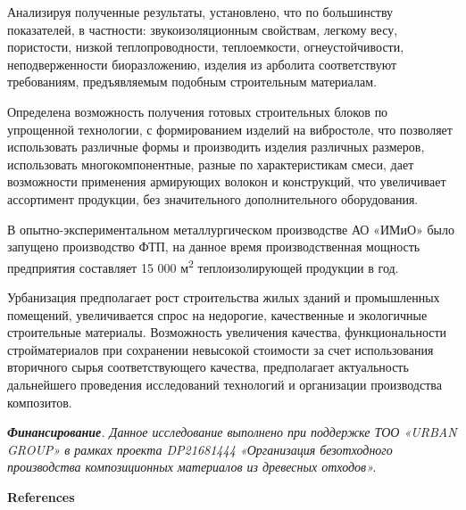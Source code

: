 \begin{multicols}{2}
Анализируя полученные результаты, установлено, что по большинству
показателей, в частности: звукоизоляционным свойствам, легкому весу,
пористости, низкой теплопроводности, теплоемкости, огнеустойчивости,
неподверженности биоразложению, изделия из арболита соответствуют
требованиям, предъявляемым подобным строительным материалам.

Определена возможность получения готовых строительных блоков по
упрощенной технологии, с формированием изделий на вибростоле, что
позволяет использовать различные формы и производить изделия различных
размеров, использовать многокомпонентные, разные по характеристикам
смеси, дает возможности применения армирующих волокон и конструкций, что
увеличивает ассортимент продукции, без значительного дополнительного
оборудования.

В опытно-экспериментальном металлургическом производстве АО «ИМиО» было
запущено производство ФТП, на данное время производственная мощность
предприятия составляет 15 000 м\textsuperscript{2} теплоизолирующей
продукции в год.

Урбанизация предполагает рост строительства жилых зданий и промышленных
помещений, увеличивается спрос на недорогие, качественные и экологичные
строительные материалы. Возможность увеличения качества,
функциональности стройматериалов при сохранении невысокой стоимости за
счет использования вторичного сырья соответствующего качества,
предполагает актуальность дальнейшего проведения исследований технологий
и организации производства композитов.

\emph{{\bfseries Финансирование}. Данное исследование выполнено при
поддержке ТОО «URBAN GROUP» в рамках проекта DP21681444 «Организация
безотходного производства композиционных материалов из древесных
отходов».}
\end{multicols}

\begin{center}
{\bfseries References}
\end{center}

